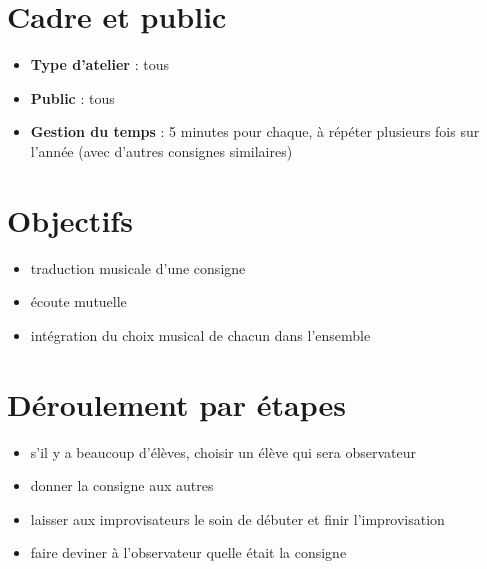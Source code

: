 \documentclass[a4paper,11pt,bibliography=totoc,numbers=noenddot,listof=flat,DIV=11,BCOR=0mm]{scrreprt}%
\begin{document}
\section*{Cadre et public}
\begin{itemize}
\item [\textbullet]\textbf{Type d'atelier} : tous

\item [\textbullet]\textbf{Public} : tous

\item [\textbullet]\textbf{Gestion du temps} : 5 minutes pour chaque, à répéter plusieurs fois sur l'année (avec d'autres consignes similaires)

\end{itemize}

\section*{Objectifs}
\begin{itemize}
\item traduction musicale d'une consigne
\item écoute mutuelle
\item intégration du choix musical de chacun dans l'ensemble
\end{itemize}


\section*{Déroulement par étapes}
\begin{itemize}
\item s'il y a beaucoup d'élèves, choisir un élève qui sera observateur
\item donner la consigne aux autres
\item laisser aux improvisateurs le soin de débuter et finir l'improvisation
\item faire deviner à l'observateur quelle était la consigne
\end{itemize}
\end{document}
